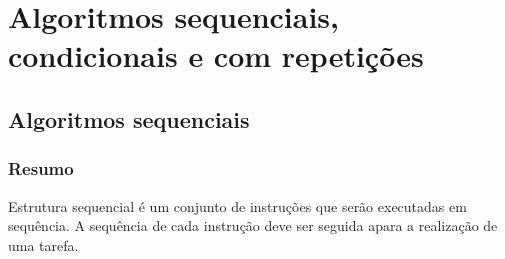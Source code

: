 
\part[Algoritmos sequenciais, condicionais e com repetições]
{Algoritmos sequenciais, condicionais e com repetições}


\chapter[Algoritmos sequenciais]
{Algoritmos sequenciais}


\section*{Resumo}

Estrutura sequencial é um conjunto de instruções que serão executadas em sequência. A sequência de cada instrução deve ser seguida apara a realização de uma tarefa.


%







